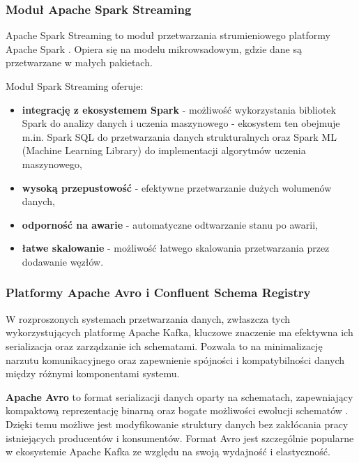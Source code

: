 \subsubsection{Moduł Apache Spark Streaming}
\label{subsubsec:spark_streaming}

Apache Spark Streaming to moduł przetwarzania strumieniowego platformy Apache Spark \cite{spark_streaming}.
Opiera się na modelu mikrowsadowym, gdzie dane są przetwarzane w małych pakietach. 

\vspace{0.3em}

Moduł Spark Streaming oferuje:

\begin{itemize}
    \item \textbf{integrację z ekosystemem Spark} - możliwość wykorzystania bibliotek Spark do analizy danych i uczenia maszynowego - ekosystem ten obejmuje m.in. Spark SQL do przetwarzania danych strukturalnych oraz Spark ML (Machine Learning Library) do implementacji algorytmów uczenia maszynowego,
    \item \textbf{wysoką przepustowość} - efektywne przetwarzanie dużych wolumenów danych,
    \item \textbf{odporność na awarie} - automatyczne odtwarzanie stanu po awarii,
    \item \textbf{łatwe skalowanie} - możliwość łatwego skalowania przetwarzania przez dodawanie węzłów.
\end{itemize}

\subsubsection{Platformy Apache Avro i Confluent Schema Registry}
\label{subsubsec:avro_schema_registry}

W rozproszonych systemach przetwarzania danych, zwłaszcza tych wykorzystujących platformę Apache Kafka, kluczowe znaczenie ma efektywna ich serializacja oraz zarządzanie ich schematami. Pozwala to na minimalizację narzutu komunikacyjnego oraz zapewnienie spójności i kompatybilności danych między różnymi komponentami systemu.

\textbf{Apache Avro} to format serializacji danych oparty na schematach, zapewniający kompaktową reprezentację binarną oraz bogate możliwości ewolucji schematów \cite{avro_documentation}. Dzięki temu możliwe jest modyfikowanie struktury danych bez zakłócania pracy istniejących producentów i konsumentów. Format Avro jest szczególnie popularne w ekosystemie Apache Kafka ze względu na swoją wydajność i elastyczność.

